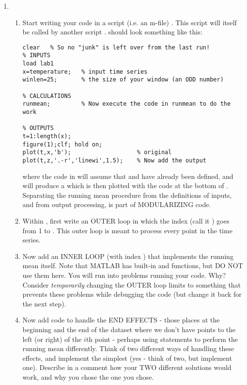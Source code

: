 \documentclass[letterpaper,11pt]{article}
\begin{document}
\begin{enumerate}

\item 
\begin{enumerate}

\item Start writing your code in a script (i.e. an m-file) .  This script 
will itself
be called by another script .  should look something like this:

\begin{boxedminipage}[h]{\linewidth}
\begin{lstlisting}
clear   % So no "junk" is left over from the last run!
% INPUTS
load lab1
x=temperature;   % input time series
winlen=25;       % the size of your window (an ODD number)

% CALCULATIONS
runmean;         % Now execute the code in runmean to do the work

% OUTPUTS
t=1:length(x);
figure(1);clf; hold on;
plot(t,x,'b');                   % original
plot(t,z,'.-r','linewi',1.5);    % Now add the output
\end{lstlisting}
\end{boxedminipage}
where the code in  will assume that  and  have already been defined,
and will produce a  which is then plotted with the code at the bottom of .
Separating the running mean procedure from the definitions of inputs, and from output 
processing, is part of MODULARIZING code.

\item Within , first write an OUTER loop in which the index (call it ) goes from 1 to . This outer loop is
meant to process every point in the time series.  

\item Now add an INNER LOOP (with index ) that implements the running mean itself. Note that MATLAB has
built-in  and  functions, but DO NOT use them here. You will run into problems
running your code. Why? Consider \emph{temporarily} changing the OUTER loop limits to something
that prevents these problems while debugging the code (but change it back for the next step).

\item Now add code to handle the END EFFECTS - those places at the beginning and the
end of the dataset where we don't have  points to the left (or right) of
the $i$th point - perhaps using  statements to perform the running mean differently.
Think of two different ways of handling these effects, and implement the
simplest (yes - think of two, but implement one). Describe in a comment how your TWO 
different solutions  would work, and why you
chose the one you chose.


\end{enumerate}
\end{enumerate}
\end{document}
